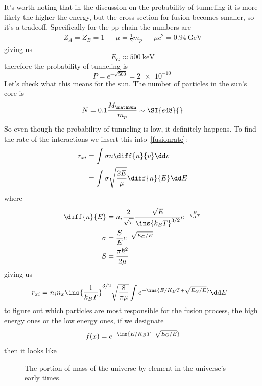 It's worth noting that in the discussion on the probability of tunneling it is more likely the higher the energy, but the cross section for fusion becomes smaller, so it's a tradeoff. Specifically for the pp-chain the numbers are
\begin{align}
	Z_A=Z_B=1 && \mu = \frac{1}{2}m_p && \mu c^2 = \SI{0.94}{\giga\electronvolt}
\end{align}
giving us 
\begin{equation}
	E_G \approx \SI{500}{\kilo\electronvolt}
\end{equation}
therefore the probability of tunneling is
\begin{equation}
	P=e^{-\sqrt{500}} = \SI{2e-10}{}
\end{equation}
Let's check what this means for the sun. The number of particles in the sun's core is
\begin{equation}
	N = 0.1 \frac{M_\mathSun}{m_p} \sim \SI{e48}{}
\end{equation}
So even though the probability of tunneling is low, it definitely happens. To find the rate of the interactions we insert this into~\ref{fusionrate}:
\begin{align}
	r_{xi} &= \int\sigma n \diff{n}{v}\dd v\\
	&= \int \sigma \sqrt{\frac{2E}{\mu}}\diff{n}{E} \dd E\\
\end{align}
where
\begin{align}
	\diff{n}{E} &= n_i\frac{2}{\sqrt{\pi}}\frac{\sqrt{E}}{\ins{k_B T}^{3/2}}e^{-\frac{E}{k_B T}}\\
	\sigma &= \frac{S}{E}e^{-\sqrt{E_G/E}}\\
	S &= \frac{\pi \hbar^2}{2\mu}
\end{align}
giving us
\begin{align}\label{rate_int}
	r_{xi} &= n_i n_x\ins{\frac{1}{k_B T}}^{3/2}\sqrt{\frac{8}{\pi\mu}}\int e^{-\ins{E/K_B T+\sqrt{E_G/E}}} \dd E
\end{align}
to figure out which particles are most responsible for the fusion process, the high energy ones or the low energy ones, if we designate
\begin{equation}
	f(x) = e^{-\ins{E/K_B T+\sqrt{E_G/E}}} 
\end{equation}
then it looks like
\begin{figure}[!htb]
	\centering
	\caption{The portion of mass of the universe by element in the universe's early times.}
\end{figure}
